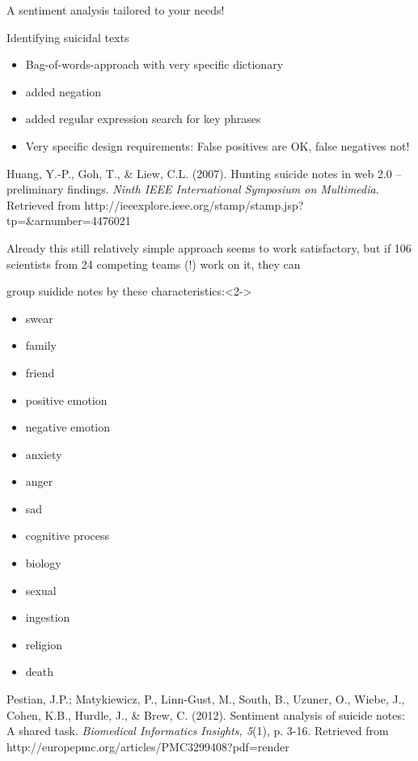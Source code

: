 \documentclass{beamer}
\begin{document}
\begin{frame}{A sentiment analysis tailored to your needs!}
\begin{block}{Identifying suicidal texts}
\begin{itemize}
\item Bag-of-words-approach with very specific dictionary
\item added negation
\item added regular expression search for key phrases
\item Very specific design requirements: False positives are OK, false negatives not!
\end{itemize}
\end{block}
\par
\tiny{Huang, Y.-P., Goh, T., \& Liew, C.L. (2007). Hunting suicide notes in web 2.0 – preliminary findings. \emph{Ninth IEEE International Symposium on Multimedia}. Retrieved from http://ieeexplore.ieee.org/stamp/stamp.jsp?tp=\&arnumber=4476021}\\
\end{frame}

\begin{frame}{}
Already this still relatively simple approach seems to work satisfactory, but if 106 scientists from 24 competing teams (!) work on it, they can 
\begin{block}{group suidide notes by these characteristics:}<2->
\begin{multicols}{2}
{\small {
\begin{itemize}
\item swear
\item family
\item friend
\item positive emotion
\item negative emotion
\item anxiety
\item anger
\item sad
\item cognitive process
\item biology
\item sexual
\item ingestion
\item religion
\item death
\end{itemize}
}}
\end{multicols}
\end{block}
\par
\tiny{Pestian, J.P.; Matykiewicz, P., Linn-Gust, M., South, B., Uzuner, O., Wiebe, J., Cohen, K.B., Hurdle, J., \& Brew, C. (2012). Sentiment analysis of suicide notes: A shared task. \emph{Biomedical Informatics Insights, 5}(1), p. 3-16. Retrieved from http://europepmc.org/articles/PMC3299408?pdf=render}\\
\end{frame}
\end{document}
